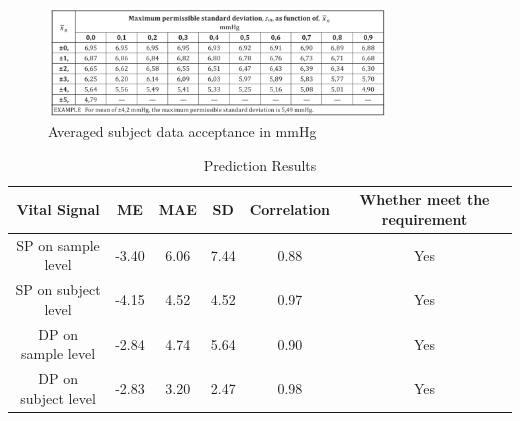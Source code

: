 \documentclass{article}
\begin{document}
\begin{figure}[H]
\centering
\includegraphics[width=0.8\textwidth]{./Fig/ME_STD_Correspond.png}
\caption{Averaged subject data acceptance in mmHg}
\label{ME_STD}
\end{figure}

\begin{table}[h!]
\centering
\begin{tabular}{|c|c|c|c|c|c|}
\hline
Vital Signal & ME & MAE & SD & Correlation & Whether meet the requirement\\ \hline


SP on sample level & -3.40 & 6.06 & 7.44 & 0.88 & Yes \\ \hline

SP on subject level & -4.15 & 4.52 & 4.52 & 0.97 & Yes \\ \hline

DP on sample level & -2.84 & 4.74 & 5.64 & 0.90 & Yes \\ \hline

DP on subject level & -2.83 & 3.20 & 2.47 & 0.98 & Yes \\ \hline


\end{tabular}
\caption{Prediction Results}
\label{tab:metrics}
\end{table}
\end{document}

